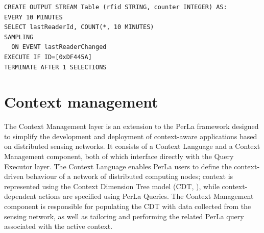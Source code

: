 \begin{lstlisting}
CREATE OUTPUT STREAM Table (rfid STRING, counter INTEGER) AS:
EVERY 10 MINUTES
SELECT lastReaderId, COUNT(*, 10 MINUTES)
SAMPLING
  ON EVENT lastReaderChanged
EXECUTE IF ID=[0xDF445A]
TERMINATE AFTER 1 SELECTIONS
\end{lstlisting}


\section{Context management}

The Context Management layer \cite{vigano_ctx} is an extension to the PerLa
framework designed to simplify the development and deployment of context-aware
applications based on distributed sensing networks. It consists of a Context
Language and a Context Management component, both of which interface directly
with the Query Executor layer. The Context Language enables PerLa users to
define the context-driven behaviour of a network of distributed computing
nodes; context is represented using the Context Dimension Tree model (CDT,
\cite{bolchiniCDT}), while context-dependent actions are specified using PerLa
Queries. The Context Management component is responsible for populating the CDT
with data collected from the sensing network, as well as tailoring and
performing the related PerLa query associated with the active context.
